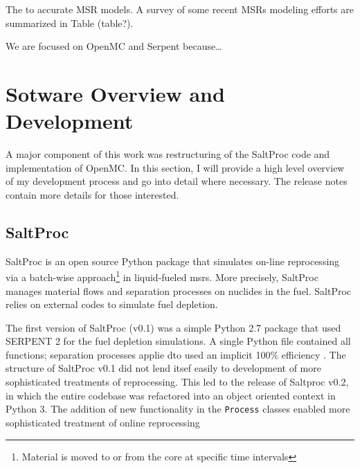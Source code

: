 
The to accurate \Gls{MSR} models.
A survey of some recent \Gls{MSR}s modeling efforts are summarized in Table (table?). 



We are focused on OpenMC and Serpent because\ldots


\section{Sotware Overview and Development}
\label{sec:soft_dev}
A major component of this work was restructuring of the SaltProc code and implementation of OpenMC. In this section, I will provide a high level overview of my development process and go into detail where necessary. The release notes contain more details for those interested.
\subsection{SaltProc}%
\label{sub:saltproc}

SaltProc\cite{rykhlevskii_saltproc_2018} is an open source Python package that simulates on-line reprocessing via a batch-wise approach\footnote{Material is moved to or from the core at specific time intervals} in liquid-fueled \Gls{msr}s. More precisely, SaltProc manages material flows and separation processes on nuclides in the fuel. SaltProc relies on external codes to simulate fuel depletion.

The first version of SaltProc (v0.1) was a simple Python 2.7 package that used SERPENT 2 for the fuel depletion simulations. A single Python file contained all functions; separation processes applie dto  used an implicit 100\% efficiency \cite{rykhlevskii_advanced_2018}. The structure of SaltProc v0.1 did not lend itsef easily to development of more sophisticated treatments of reprocessing. This led to the release of Saltproc v0.2, in which the entire codebase was refactored into an object oriented
context in Python 3. The addition of new functionality in the \verb.Process. classes enabled more sophisticated treatment of online reprocessing \cite{rykhlevskii_fuel_2020} 

